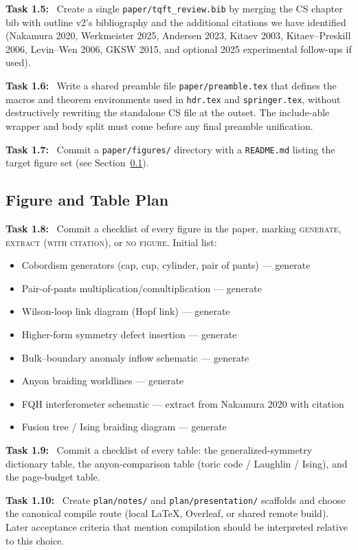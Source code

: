 \documentclass[11pt]{article}
\newcommand{\task}[1]{\medskip\noindent\textbf{Task #1:}\ }
\begin{document}
\task{1.5} Create a single \texttt{paper/tqft\_review.bib} by merging the CS chapter
bib with outline v2's bibliography and the additional citations we have identified
(Nakamura 2020, Werkmeister 2025, Andersen 2023, Kitaev 2003, Kitaev--Preskill 2006,
Levin--Wen 2006, GKSW 2015, and optional 2025 experimental follow-ups if used).

\task{1.6} Write a shared preamble file \texttt{paper/preamble.tex} that defines the
macros and theorem environments used in \texttt{hdr.tex} and \texttt{springer.tex},
without destructively rewriting the standalone CS file at the outset. The include-able
wrapper and body split must come before any final preamble unification.

\task{1.7} Commit a \texttt{paper/figures/} directory with a \texttt{README.md}
listing the target figure set (see Section~\ref{sec:figures}).

\subsection{Figure and Table Plan}\label{sec:figures}

\task{1.8} Commit a checklist of every figure in the paper, marking \textsc{generate},
\textsc{extract (with citation)}, or \textsc{no figure}. Initial list:
\begin{itemize}[leftmargin=2em]
\item Cobordism generators (cap, cup, cylinder, pair of pants) --- generate
\item Pair-of-pants multiplication/comultiplication --- generate
\item Wilson-loop link diagram (Hopf link) --- generate
\item Higher-form symmetry defect insertion --- generate
\item Bulk--boundary anomaly inflow schematic --- generate
\item Anyon braiding worldlines --- generate
\item FQH interferometer schematic --- extract from Nakamura 2020 with citation
\item Fusion tree / Ising braiding diagram --- generate
\end{itemize}

\task{1.9} Commit a checklist of every table: the generalized-symmetry dictionary table,
the anyon-comparison table (toric code / Laughlin / Ising), and the page-budget table.

\task{1.10} Create \texttt{plan/notes/} and \texttt{plan/presentation/} scaffolds and
choose the canonical compile route (local LaTeX, Overleaf, or shared remote build). Later
acceptance criteria that mention compilation should be interpreted relative to this choice.
\end{document}
